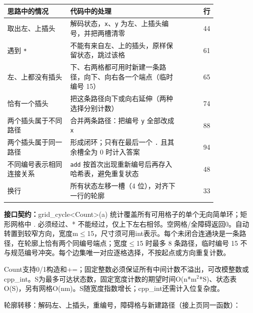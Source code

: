 \begin{center}\small
\begin{tabular}{@{}p{0.30\linewidth}p{0.55\linewidth}r@{}}
\toprule
思路中的情况 & 代码中的处理 & 行\\
\midrule
取出左、上插头 & 解码状态，\texttt{x}、\texttt{y} 为左、上插头编号，并把两槽清零 & 44\\
遇到 \texttt{*} & 不能有来自左、上的插头，原样保留状态，跳过该格 & 61\\
左、上都没有插头 & 下、右两格都可用时新建一条路径，向下、向右各一个端点（临时编号 15） & 65\\
恰有一个插头 & 把这条路径向下或向右延伸（两种选择分别计数） & 74\\
两个插头属于不同路径 & 合并两条路径：把编号 \texttt{y} 全部改成 \texttt{x} & 88\\
两个插头属于同一路径 & 形成闭环；只有在最后一个 \texttt{.} 且其余槽全为 0 时计入答案 & 94\\
不同编号表示相同连接关系 & \texttt{add} 按首次出现重新编号后再存入哈希表，避免重复状态 & 48\\
换行 & 所有状态左移一槽（4 位），对齐下一行的轮廓 & 33\\
\bottomrule
\end{tabular}
\end{center}



{\sloppy{}\noindent\textbf{接口契约：}grid\_cycle<Count>(a) 统计覆盖所有可用格子的单个无向简单环；矩形网格中 . 必须经过、* 不能经过，仅上下左右相邻。空网格/全障碍返回0。自动转置到较窄方向，宽度m$\le$15，尺寸须可用int表示。每个未闭合连通块是一条路径，在轮廓上恰有两个同编号端点；宽度$\le$15 时最多 8 条路径，临时编号 15 不与规范编号冲突。每个边集唯一对应逐格选择，不按起点或方向重复计数。

Count支持0/1构造和+=；固定整数必须保证所有中间计数不溢出，可改模整数或cpp\_int。S为最多可达状态数，固定宽度计数的期望时间O(n*m$^{2}$*S)、状态表O(S)，另有网格O(nm)。S随宽度指数增长；cpp\_int还需计入位复杂度。\par}

\Needspace{479pt}



\newpage

轮廓转移：解码左、上插头，重编号，障碍格与新建路径（接上页同一函数）：



